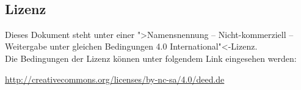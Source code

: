 \documentclass[11pt, a4paper]{article}
\begin{document}
\newpage
~
\vfill
{\footnotesize
\subsection*{Lizenz}
Dieses Dokument steht unter einer ">Namensnennung -- Nicht-kommerziell -- Weitergabe unter gleichen Bedingungen 4.0 International"<-Lizenz.\\

\noindent
Die Bedingungen der Lizenz können unter folgendem Link eingesehen werden: 

\noindent
\url{http://creativecommons.org/licenses/by-nc-sa/4.0/deed.de}}
\end{document}
